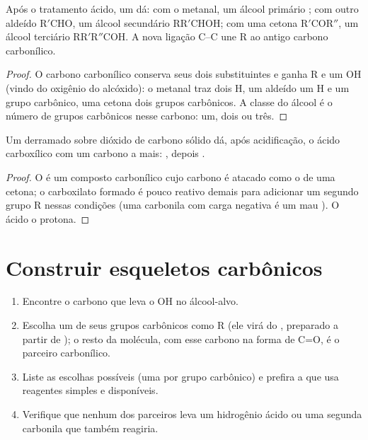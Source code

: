 \begin{proposition}\label{prop:b1:organomagnesium:carbonyl-addition}
Após o tratamento ácido, um   dá: com o
metanal, um álcool primário ; com outro aldeído $\mathrm{R'CHO}$, um
álcool secundário $\mathrm{RR'CHOH}$; com uma cetona $\mathrm{R'COR''}$, um álcool terciário
$\mathrm{RR'R''COH}$. A nova ligação C--C une R ao antigo carbono carbonílico.
\end{proposition}

\begin{proof}
O carbono carbonílico conserva seus dois substituintes e ganha R e um OH
(vindo do oxigênio do alcóxido): o metanal traz dois H, um aldeído um H
e um grupo carbônico, uma cetona dois grupos carbônicos. A classe do
álcool é o número de grupos carbônicos nesse carbono: um, dois ou três.
\end{proof}

\begin{proposition}\label{prop:b1:organomagnesium:co2}
Um  derramado sobre dióxido de carbono sólido dá,
após acidificação, o ácido carboxílico  com um carbono a mais:
, depois .
\end{proposition}

\begin{proof}
O  é um composto carbonílico cujo carbono é atacado como o de
uma cetona; o carboxilato formado é pouco reativo demais para adicionar
um segundo grupo R nessas condições (uma carbonila com carga negativa é
um mau ). O ácido o protona.
\end{proof}

\section{Construir esqueletos carbônicos}

\begin{method}\label{met:b1:organomagnesium:plan-alcohol}
\begin{enumerate}
  \item Encontre o carbono que leva o OH no álcool-alvo.
  \item Escolha um de seus grupos carbônicos como R (ele virá do
        , preparado a partir de ); o resto
        da molécula, com esse carbono na forma de C=O, é o parceiro
        carbonílico.
  \item Liste as escolhas possíveis (uma por grupo carbônico) e prefira a
        que usa reagentes simples e disponíveis.
  \item Verifique que nenhum dos parceiros leva um hidrogênio ácido ou
        uma segunda carbonila que também reagiria.
\end{enumerate}
\end{method}

